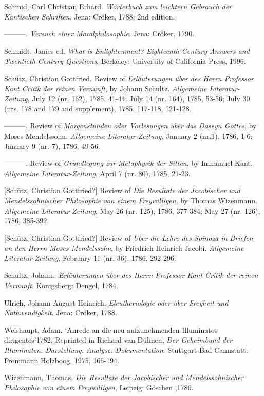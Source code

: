 Schmid, Carl Christian Erhard. \textit{W\"{o}rterbuch zum leichtern Gebrauch der Kantischen Schriften}. Jena: Cr\"{o}ker, 1788; 2nd edition.

{---}{---}{---}. \textit{Versuch einer Moralphilosophie}. Jena: Cr\"{o}ker, 1790.

Schmidt, James ed. \textit{What is Enlightenment? Eighteenth{-}Century Answers and Twentieth{-}Century Questions}. Berkeley: University of California Press, 1996.

Sch\"{u}tz, Christian Gottfried. Review of \textit{Erl\"{a}uterungen \"{u}ber des Herrn Professor Kant Critik der reinen Vernunft}, by Johann Schultz. \textit{Allgemeine Literatur{-}Zeitung}, July 12 (nr. 162), 1785, 41{-}44; July 14 (nr. 164), 1785, 53{-}56; July 30 (nrs. 178 and 179 and supplement), 1785, 117{-}118, 121{-}128.

{---}{---}{---}. Review of \textit{Morgenstunden oder Vorlesungen \"{u}ber das Daseyn Gottes}, by Moses Mendelssohn. \textit{Allgemeine Literatur{-}Zeitung}, January 2 (nr.1), 1786, 1{-}6; January 9 (nr. 7), 1786, 49{-}56.

{---}{---}{---}. Review of \textit{Grundlegung zur Metaphysik der Sitten}, by Immanuel Kant. \textit{Allgemeine Literatur{-}Zeitung}, April 7 (nr. 80), 1785, 21{-}23.

[Sch\"{u}tz, Christian Gottfried?] Review of \textit{Die Resultate der Jacobischer und Mendelssohnischer Philosophie von einem Freywilligen}, by Thomas Wizenmann. \textit{Allgemeine Literatur{-}Zeitung}, May 26 (nr. 125), 1786, 377{-}384; May 27 (nr. 126), 1786, 385{-}392.

[Sch\"{u}tz, Christian Gottfried?] Review of \textit{\"{U}ber die Lehre des Spinoza in Briefen an den Herrn Moses Mendelssohn}, by Friedrich Heinrich Jacobi. \textit{Allgemeine Literatur{-}Zeitung}, February 11 (nr. 36), 1786, 292{-}296.

Schultz, Johann. \textit{Erl\"{a}uterungen \"{u}ber des Herrn Professor Kant Critik der reinen Vernunft}. K\"{o}nigsberg: Dengel, 1784. 

Ulrich, Johann August Heinrich.\textit{ Eleutheriologie oder \"{u}ber Freyheit und Nothwendigkeit}. Jena: Cr\"{o}ker, 1788.

Weishaupt, Adam. `Anrede an die neu aufzunehmenden Illuminatos dirigentes'1782. Reprinted in Richard van D\"{u}lmen, \textit{Der Geheimbund der Illuminaten. Darstellung. Analyse. Dokumentation}. Stuttgart{-}Bad Cannstatt: Frommann Holzboog, 1975, 166{-}194.

Wizenmann, Thomas.\textit{ Die Resultate der Jacobischer und Mendelssohnischer Philosophie von einem Freywilligen}, Leipzig: G\"{o}schen ,1786.

